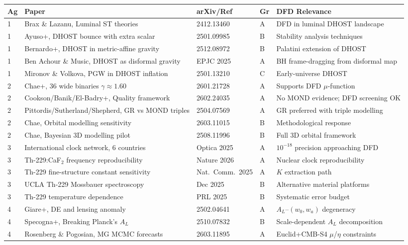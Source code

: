 \documentclass[11pt,a4paper]{article}
\begin{document}
\begin{longtable}{p{0.5cm}p{5cm}p{3cm}p{1cm}p{4cm}}
\toprule
\textbf{Ag} & \textbf{Paper} & \textbf{arXiv/Ref} & \textbf{Gr} & \textbf{DFD Relevance} \\
\midrule
\endhead
1 & Brax \& Lazanu, Luminal ST theories & 2412.13460 & A & DFD in luminal DHOST landscape \\
1 & Ayuso+, DHOST bounce with extra scalar & 2501.09985 & B & Stability analysis techniques \\
1 & Bernardo+, DHOST in metric-affine gravity & 2512.08972 & B & Palatini extension of DHOST \\
1 & Ben Achour \& Music, DHOST as disformal gravity & EPJC 2025 & A & BH frame-dragging from disformal map \\
1 & Mironov \& Volkova, PGW in DHOST inflation & 2501.13210 & C & Early-universe DHOST \\
\midrule
2 & Chae+, 36 wide binaries $\gamma \approx 1.60$ & 2601.21728 & A & Supports DFD $\mu$-function \\
2 & Cookson/Banik/El-Badry+, Quality framework & 2602.24035 & A & No MOND evidence; DFD screening OK \\
2 & Pittordis/Sutherland/Shepherd, GR vs MOND triples & 2504.07569 & A & GR preferred with triple modelling \\
2 & Chae, Orbital modelling sensitivity & 2603.11015 & B & Methodological response \\
2 & Chae, Bayesian 3D modelling pilot & 2508.11996 & B & Full 3D orbital framework \\
\midrule
3 & International clock network, 6 countries & Optica 2025 & A & $10^{-18}$ precision approaching DFD \\
3 & Th-229:CaF$_2$ frequency reproducibility & Nature 2026 & A & Nuclear clock reproducibility \\
3 & Th-229 fine-structure constant sensitivity & Nat.\ Comm.\ 2025 & A & $K$ extraction path \\
3 & UCLA Th-229 Mossbauer spectroscopy & Dec 2025 & B & Alternative material platforms \\
3 & Th-229 temperature dependence & PRL 2025 & B & Systematic error budget \\
\midrule
4 & Giare+, DE and lensing anomaly & 2502.04641 & A & $A_L$--$(w_0,w_a)$ degeneracy \\
4 & Specogna+, Breaking Planck's $A_L$ & 2510.07832 & B & Scale-dependent $A_L$ decomposition \\
4 & Rosenberg \& Pogosian, MG MCMC forecasts & 2603.11895 & A & Euclid+CMB-S4 $\mu$/$\eta$ constraints \\

\end{longtable}
\end{document}
